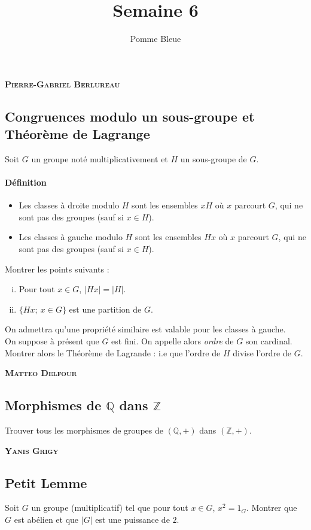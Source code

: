 \documentclass[17pt]{article}
\title{Semaine 6}
\author{Pomme Bleue}
\def\Z{\mathbb Z}
\def\Q{\mathbb Q}
\begin{document}
	\maketitle
	\begin{center}
		\bfseries\Large\textsc{Pierre-Gabriel Berlureau}
	\end{center}
	\subsection*{Congruences modulo un sous-groupe et Théorème de Lagrange}
	Soit $G$ un groupe noté multiplicativement et $H$ un sous-groupe de $G$.
	\paragraph*{Définition}
	\begin{itemize}
		\item Les classes à droite modulo $H$ sont les ensembles $xH$ où $x$ parcourt $G$, qui ne sont pas des groupes (sauf si $x\in H$).
		\item Les classes à gauche modulo $H$ sont les ensembles $Hx$ où $x$ parcourt $G$, qui ne sont pas des groupes (sauf si $x\in H$).
	\end{itemize}
	Montrer les points suivants : 
	\begin{enumerate}[i)]
		\item Pour tout $x\in G$, $|Hx|=|H|$.
		\item $\lbrace Hx;\ x\in G\rbrace$ est une partition de $G$.
	\end{enumerate}
	On admettra qu'une propriété similaire est valable pour les classes à gauche.\\
	On suppose à présent que $G$ est fini. On appelle alors \textit{ordre} de $G$ son cardinal. Montrer alors le Théorème de Lagrande : i.e que l'ordre de $H$ divise l'ordre de $G$.
	
	\begin{center}
		\bfseries\Large\textsc{Matteo Delfour}
	\end{center}
	\subsection*{Morphismes de $\Q$ dans $\Z$}
		Trouver tous les morphismes de groupes de $(\Q,+)$ dans $(\Z,+)$.
	\begin{center}
		\bfseries\Large\textsc{Yanis Grigy}
	\end{center}
	\subsection*{Petit Lemme}
	Soit $G$ un groupe (multiplicatif) tel que pour tout $x\in G$, $x^2=1_G$. Montrer que $G$ est abélien et que $|G|$ est une puissance de $2$.
		
\end{document}
